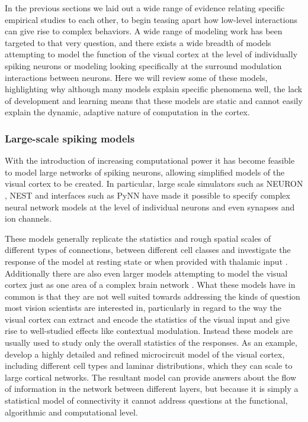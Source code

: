 In the previous sections we laid out a wide range of evidence
relating specific empirical studies to each other, to begin teasing
apart how low-level interactions can give rise to complex behaviors. A
wide range of modeling work has been targeted to that very
question, and there exists a wide breadth of models attempting to model
the function of the visual cortex at the level of individually spiking
neurons or modeling looking specifically at the surround modulation
interactions between neurons. Here we will review some of these
models, highlighting why although many models explain specific
phenomena well, the lack of development and learning means that these
models are static and cannot easily explain the dynamic, adaptive
nature of computation in the cortex.

\subsubsection{Large-scale spiking models} \label{LargeModels}

With the introduction of increasing computational power it has become
feasible to model large networks of spiking neurons, allowing
simplified models of the visual cortex to be created. In particular,
large scale simulators such as NEURON \citep{Hines1994}, NEST
\citep{Gewaltig2007} and interfaces such as PyNN \citep{Davison2009}
have made it possible to specify complex neural network models at the
level of individual neurons and even synapses and ion channels.

These models generally replicate the statistics and rough spatial
scales of different types of connections, between different cell
classes and investigate the response of the model at resting state or
when provided with thalamic input \citep{Shelley2002,
  Potjans2014}. Additionally there are also even larger models
attempting to model the visual cortex just as one area of a complex
brain network \citep{Eliasmith2012}. What these models have in common
is that they are not well suited towards addressing the kinds of
question most vision scientists are interested in, particularly in
regard to the way the visual cortex can extract and encode the
statistics of the visual input and give rise to well-studied effects
like contextual modulation. Instead these models are usually used to
study only the overall statistics of the responses. As an example,
\cite{Potjans2014} develop a highly detailed and refined microcircuit
model of the visual cortex, including different cell types and laminar
distributions, which they can scale to large cortical networks. The
resultant model can provide answers about the flow of information in
the network between different layers, but because it is simply a
statistical model of connectivity it cannot address questions at the
functional, algorithmic and computational level.

